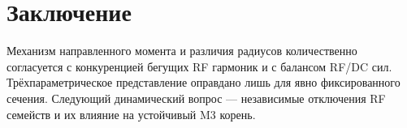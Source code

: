 \documentclass[11pt]{article}
\begin{document}
\section{Заключение}
Механизм направленного момента и различия радиусов количественно согласуется с конкуренцией бегущих RF гармоник и с балансом RF/DC сил. Трёхпараметрическое представление оправдано лишь для явно фиксированного сечения. Следующий динамический вопрос --- независимые отключения RF семейств и их влияние на устойчивый M3 корень.
\end{document}
